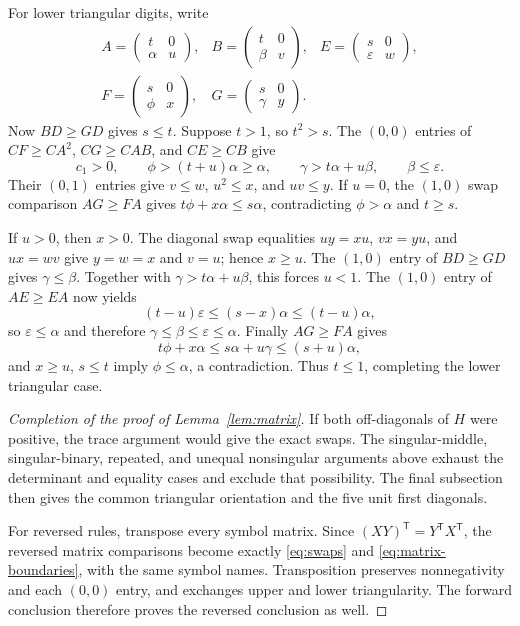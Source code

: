 \documentclass[11pt,a4paper]{article}
\begin{document}
For lower triangular digits, write
\[
\begin{array}{lll}
A=\begin{pmatrix}t&0\\\alpha&u\end{pmatrix},&
B=\begin{pmatrix}t&0\\\beta&v\end{pmatrix},&
E=\begin{pmatrix}s&0\\\varepsilon&w\end{pmatrix},\\[4pt]
F=\begin{pmatrix}s&0\\\phi&x\end{pmatrix},&
G=\begin{pmatrix}s&0\\\gamma&y\end{pmatrix}.&
\end{array}
\]
Now $BD\ge GD$ gives $s\le t$. Suppose $t>1$, so $t^2>s$.
The $(0,0)$ entries of $CF\ge CA^2$, $CG\ge CAB$, and $CE\ge CB$
give
\[
c_1>0,\qquad \phi>(t+u)\alpha\ge\alpha,\qquad
\gamma>t\alpha+u\beta,\qquad \beta\le\varepsilon.
\]
Their $(0,1)$ entries give $v\le w$, $u^2\le x$, and $uv\le y$.
If $u=0$, the $(1,0)$ swap comparison $AG\ge FA$ gives
$t\phi+x\alpha\le s\alpha$, contradicting $\phi>\alpha$ and
$t\ge s$.

If $u>0$, then $x>0$. The diagonal swap equalities
$uy=xu$, $vx=yu$, and $ux=wv$ give
$y=w=x$ and $v=u$; hence $x\ge u$.
The $(1,0)$ entry of $BD\ge GD$ gives $\gamma\le\beta$.
Together with $\gamma>t\alpha+u\beta$, this forces $u<1$.
The $(1,0)$ entry of $AE\ge EA$ now yields
\[
(t-u)\varepsilon\le(s-x)\alpha
 \le(t-u)\alpha,
\]
so $\varepsilon\le\alpha$ and therefore
$\gamma\le\beta\le\varepsilon\le\alpha$.
Finally $AG\ge FA$ gives
\[
t\phi+x\alpha\le s\alpha+u\gamma
 \le(s+u)\alpha,
\]
and $x\ge u$, $s\le t$ imply $\phi\le\alpha$, a contradiction.
Thus $t\le1$, completing the lower triangular case.

\begin{proof}[Completion of the proof of Lemma~\ref{lem:matrix}]
If both off-diagonals of $H$ were positive, the trace argument would
give the exact swaps. The singular-middle, singular-binary, repeated,
and unequal nonsingular arguments above exhaust the determinant and
equality cases and exclude that possibility. The final subsection then
gives the common triangular orientation and the five unit first
diagonals.

For reversed rules, transpose every symbol matrix. Since
$(XY)^\mathsf T=Y^\mathsf TX^\mathsf T$, the reversed matrix comparisons
become exactly \eqref{eq:swaps} and \eqref{eq:matrix-boundaries}, with
the same symbol names. Transposition preserves nonnegativity and each
$(0,0)$ entry, and exchanges upper and lower triangularity.
The forward conclusion therefore proves the reversed conclusion as
well.
\end{proof}
\end{document}
